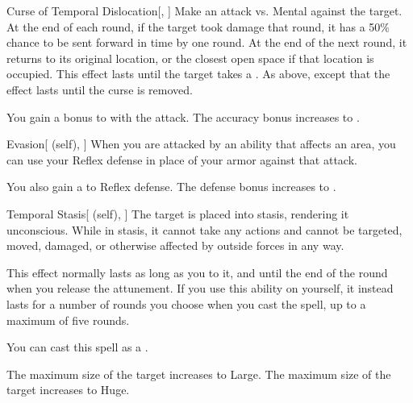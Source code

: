 \lowercase{\hypertarget{spell:Curse of Temporal Dislocation}{}}\label{spell:Curse of Temporal Dislocation}
\begin{freeability}[Rank 4]{\hypertarget{spell:Curse of Temporal Dislocation}{Curse of Temporal Dislocation}}[, ]
Make an attack vs. Mental against the target.
\hit At the end of each round, if the target took damage that round, it has a 50\% chance to be sent forward in time by one round.
At the end of the next round, it returns to its original location, or the closest open space if that location is occupied.
This effect lasts until the target takes a .
\crit As above, except that the effect lasts until the curse is removed.

\rankline
{} You gain a  bonus to  with the attack.
 The accuracy bonus increases to .
\end{freeability}
\vspace{0.25em}



\lowercase{\hypertarget{spell:Evasion}{}}\label{spell:Evasion}
\begin{attuneability}[Rank 4]{\hypertarget{spell:Evasion}{Evasion}}[ (self), ]
When you are attacked by an ability that affects an area, you can use your Reflex defense in place of your armor against that attack.

\rankline
{} You also gain a   to Reflex defense.
 The defense bonus increases to .
\end{attuneability}
\vspace{0.25em}



\lowercase{\hypertarget{spell:Temporal Stasis}{}}\label{spell:Temporal Stasis}
\begin{attuneability}[Rank 4]{\hypertarget{spell:Temporal Stasis}{Temporal Stasis}}[ (self), ]
The target is placed into stasis, rendering it unconscious.
While in stasis, it cannot take any actions and cannot be targeted, moved, damaged, or otherwise affected by outside forces in any way.

This effect normally lasts as long as you  to it, and until the end of the round when you release the attunement.
If you use this ability on yourself, it instead lasts for a number of rounds you choose when you cast the spell, up to a maximum of five rounds.

You can cast this spell as a .

\rankline
{} The maximum size of the target increases to Large.
 The maximum size of the target increases to Huge.
\end{attuneability}
\vspace{0.25em}



